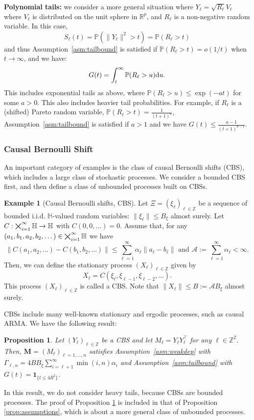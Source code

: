 \documentclass[11pt,a4paper]{article}
\newtheorem{proposition}[theorem]{Proposition}
\theoremstyle{remark}
\theoremstyle{definition}
\theoremstyle{definition}
\newtheorem{example}{Example}
\newcommand{\Surv}{S}
\newcommand{\rc}{\color{black}}
\begin{document}
\begin{bibunit}[apalike]
\textbf{Polynomial tails:} we consider a more general situation where $Y_\ell = \sqrt{R_\ell} V_\ell$ where $V_\ell$ is distributed on the unit sphere in $\mathbb{R}^p$, and $R_\ell$ is a non-negative random variable. In this case,
$$ \Surv_\ell(t) =  \mathbb{P}(\|Y_\ell\|^2 > t )  = \mathbb{P}( R_\ell > t )  $$
and thus Assumption~\ref{asm:tailbound} is satisfied if $\mathbb{P}( R_\ell > t ) =o(1/t)$ when $t\rightarrow\infty$, and we have:
$$ G(t) = \int_{t}^{\infty} \mathbb{P}( R_\ell > u )  {\rm d} u . $$
This includes exponential tails as above, where $ \mathbb{P}( R_\ell > u ) \leq \exp(-at)  $ for some $a>0$. This also includes heavier tail probabilities.
For example, if $R_\ell$ is a (shifted) Pareto random variable, $\mathbb{P}( R_\ell > t ) = \frac{1}{(t+1)^a} $, Assumption~\ref{asm:tailbound} is satisfied if $a>1$ and we have $G(t) \leq \frac{a-1}{(t+1)^{a-1}} $.

\subsubsection{Causal Bernoulli Shift}
An important category of examples is the class of causal Bernoulli shifts (CBS), which includes a large class of stochastic processes. We consider a bounded CBS first, and then define a class of unbounded processes built on CBSs.
\begin{example}[Causal Bernoulli shifts, CBS]
\label{exm:cbs}
Let $\Xi = (\xi_\ell)_{\ell\in\mathbb{Z}}$ be a sequence of bounded i.i.d. $\mathbb{H}$-valued random variables: $\|\xi_\ell\| \leq B_\xi $ almost surely. Let $C:{\rc\bigtimes_{i=1}^{\infty}\mathbb{H}} \rightarrow \mathbb{H}$ with $C(0,0,\dots)=0$. Assume that, for any $(a_1,b_1,a_2,b_2,\dots)\in {\rc\bigtimes_{i=1}^{\infty}\mathbb{H}}$ we have
$$ \| C(a_1,a_2,\dots) - C(b_1,b_2,\dots) \| \leq \sum_{\ell=1}^{\infty} \alpha_\ell \|a_\ell-b_\ell \| \text{ and } \mathcal{A} := \sum_{\ell=1}^\infty \alpha_\ell < \infty. $$
Then, we can define the stationary process $(X_\ell)_{\ell\in\mathbb{Z}}$ given by
$$ X_\ell = C(\xi_{\ell},\xi_{\ell-1},\xi_{\ell-2},\dots). $$
This process $(X_\ell)_{\ell\in\mathbb{Z}}$ is called a CBS. Note that $\|X_{\ell}\|\leq B :=  \mathcal{A} B_\xi $ almost surely.
\end{example}

CBSs include many well-known stationary and ergodic processes, such as causal ARMA.
We have the following result:
\begin{proposition}\label{prop:cbs}
Let $(Y_\ell)_{\ell\in\mathbb{Z}}$ be a CBS and {\rc let} $M_\ell =Y_\ell Y_{\ell}^\top $ for any $\ell\in\mathbb{Z}^2$.
Then, $\mathbf{M}=(M_\ell)_{\ell=1,\dots,n}$ satisfies Assumption~\ref{asm:weakdep} with $\Gamma_{\ell,n} = 4 B B_\xi \sum_{i=\ell+1}^\infty \min(i,n) \alpha_i $ and Assumption~\ref{asm:tailbound} with $G(t) =  \mathbf{1}_{\{t\leq 4B^2\}}$.
\end{proposition}
In this result, we do not consider heavy tails, because CBSs are bounded processes.
The proof of Proposition \ref{prop:cbs} is included in that of Proposition \ref{prop:assumptions}, which is about a more general class of unbounded processes.


\end{bibunit}
\end{document}
